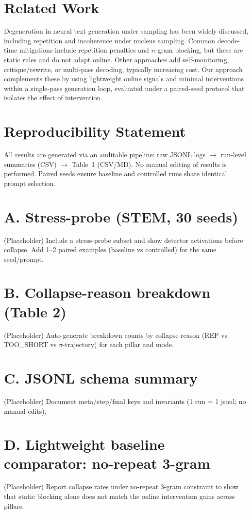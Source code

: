 \documentclass{article}
\begin{document}
\section{Related Work}
Degeneration in neural text generation under sampling has been widely discussed, including repetition and incoherence under nucleus sampling.
Common decode-time mitigations include repetition penalties and $n$-gram blocking, but these are static rules and do not adapt online.
Other approaches add self-monitoring, critique/rewrite, or multi-pass decoding, typically increasing cost.
Our approach complements these by using lightweight online signals and minimal interventions within a single-pass generation loop,
evaluated under a paired-seed protocol that isolates the effect of intervention.

\section{Reproducibility Statement}
All results are generated via an auditable pipeline:
raw JSONL logs $\rightarrow$ run-level summaries (CSV) $\rightarrow$ Table~1 (CSV/MD).
No manual editing of results is performed.
Paired seeds ensure baseline and controlled runs share identical prompt selection.


\appendix

\section{A. Stress-probe (STEM, 30 seeds)}
\label{app:stress}
(Placeholder) Include a stress-probe subset and show detector activations before collapse.
Add 1--2 paired examples (baseline vs controlled) for the same seed/prompt.

\section{B. Collapse-reason breakdown (Table 2)}
\label{app:reasons}
(Placeholder) Auto-generate breakdown counts by collapse reason (REP vs TOO\_SHORT vs $\pi$-trajectory)
for each pillar and mode.

\section{C. JSONL schema summary}
(Placeholder) Document meta/step/final keys and invariants (1 run = 1 jsonl; no manual edits).

\section{D. Lightweight baseline comparator: no-repeat 3-gram}
\label{app:baseline}
(Placeholder) Report collapse rates under no-repeat 3-gram constraint to show that static blocking alone
does not match the online intervention gains across pillars.


\end{document}

